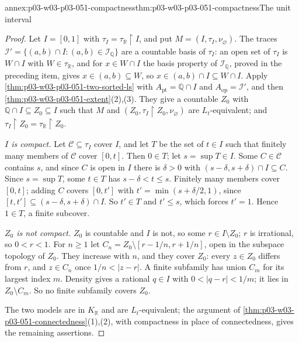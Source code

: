 \begin{annexitem}{annex:p03-w03-p03-051-compactness}{thm:p03-w03-p03-051-compactness}{The unit interval}
\begin{proof}
Let \(I=[0,1]\) with \(\tau_I=\tau_{\mathbb R}\restriction I\), and put
\(M=(I,\tau_I,\nu_\varnothing)\). The traces
\(\mathcal I'=\{(a,b)\cap I:(a,b)\in\mathcal I_{\mathbb Q}\}\) are a
countable basis of \(\tau_I\): an open set of \(\tau_I\) is \(W\cap I\)
with \(W\in\tau_{\mathbb R}\), and for \(x\in W\cap I\) the basis property
of \(\mathcal I_{\mathbb Q}\), proved in the preceding item, gives
\(x\in(a,b)\subseteq W\), so \(x\in(a,b)\cap I\subseteq W\cap I\). Apply
\cref{thm:p03-w03-p03-051-two-sorted-ls} with
\(A_{\mathrm{pt}}=\mathbb Q\cap I\) and \(A_{\mathrm{op}}=\mathcal I'\), and
then \cref{thm:p03-w03-p03-051-extent}(2),(3). They give a countable
\(Z_0\) with \(\mathbb Q\cap I\subseteq Z_0\subseteq I\) such that \(M\) and
\((Z_0,\tau_I\restriction Z_0,\nu_\varnothing)\) are \(L_t\)-equivalent;
and \(\tau_I\restriction Z_0=\tau_{\mathbb R}\restriction Z_0\).

\emph{\(I\) is compact.} Let \(\mathcal C\subseteq\tau_I\) cover \(I\), and
let \(T\) be the set of \(t\in I\) such that finitely many members of
\(\mathcal C\) cover \([0,t]\). Then \(0\in T\); let \(s=\sup T\in I\).
Some \(C\in\mathcal C\) contains \(s\), and since \(C\) is open in \(I\)
there is \(\delta>0\) with
\((s-\delta,s+\delta)\cap I\subseteq C\). Since \(s=\sup T\), some
\(t\in T\) has \(s-\delta<t\le s\). Finitely many
members cover \([0,t]\); adding \(C\) covers
\([0,t']\) with \(t'=\min(s+\delta/2,1)\), since
\([t,t']\subseteq(s-\delta,s+\delta)\cap I\). So \(t'\in T\) and
\(t'\le s\), which forces \(t'=1\). Hence \(1\in T\), a finite subcover.

\emph{\(Z_0\) is not compact.} \(Z_0\) is countable and \(I\) is not, so
some \(r\in I\setminus Z_0\); \(r\) is irrational, so \(0<r<1\). For
\(n\ge1\) let \(C_n=Z_0\setminus[r-1/n,r+1/n]\), open in the subspace
topology of \(Z_0\). They increase with \(n\), and they cover \(Z_0\): every
\(z\in Z_0\) differs from \(r\), and \(z\in C_n\) once \(1/n<\lvert z-r\rvert\).
A finite subfamily has union \(C_m\) for its largest index \(m\). Density
gives a rational \(q\in I\) with \(0<\lvert q-r\rvert<1/m\); it lies in
\(Z_0\setminus C_m\). So no finite subfamily covers \(Z_0\).

The two models are in \(K_{\mathbb R}\) and are \(L_t\)-equivalent; the
argument of \cref{thm:p03-w03-p03-051-connectedness}(1),(2), with
compactness in place of connectedness, gives the remaining assertions.
\end{proof}
\end{annexitem}

